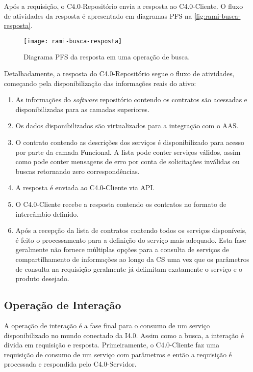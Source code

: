 Após a requisição, o C4.0-Repositório envia a resposta ao C4.0-Cliente. O fluxo de atividades da resposta é apresentado em diagramas PFS na \autoref{fig:rami-busca-resposta}.

\begin{figure}[htb]
	\centering
	\texttt{[image: rami-busca-resposta]}
	\caption{Diagrama PFS da resposta em uma operação de busca.}
	\label{fig:rami-busca-resposta}
\end{figure}

Detalhadamente, a resposta do C4.0-Repositório segue o fluxo de atividades, começando pela disponibilização das informações reais do ativo:

\begin{enumerate}
	\item As informações do \textit{software} repositório contendo os contratos são acessadas e disponibilizadas para as camadas superiores.

	\item Os dados disponibilizados são virtualizados para a integração com o AAS.

	\item O contrato contendo as descrições dos serviços é disponibilizado para acesso por parte da camada Funcional. A lista  pode conter serviços válidos, assim como pode conter mensagens de erro por conta de solicitações inválidas ou buscas retornando zero correspondências.

	\item A resposta é enviada ao C4.0-Cliente via API.

	\item O C4.0-Cliente recebe a resposta contendo os contratos no formato de intercâmbio definido.

	\item Após a recepção da lista de contratos contendo todos os serviços disponíveis, é feito o processamento para a definição do serviço mais adequado. Esta fase geralmente não fornece múltiplas opções para a consulta de serviços de compartilhamento de informações ao longo da CS uma vez que os parâmetros de consulta na requisição geralmente já delimitam exatamente o serviço e o produto desejado.
\end{enumerate}

\subsection{Operação de Interação}

A operação de interação é a fase final para o consumo de um serviço disponibilizado no mundo conectado da I4.0. Assim como a busca, a interação é divida em requisição e resposta. Primeiramente, o C4.0-Cliente faz uma requisição de consumo de um serviço com parâmetros e então a requisição é processada e respondida pelo C4.0-Servidor.


